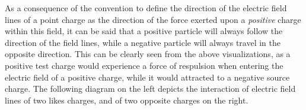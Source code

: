 As a consequence of the convention to define the direction of the electric field lines of a point charge as the direction of the force exerted upon a \emph{positive} charge within this field, it can be said that a positive particle will always follow the direction of the field lines, while a negative particle will always travel in the opposite direction. This can be clearly seen from the above visualizations, as a positive test charge would experience a force of respulsion when entering the electric field of a positive charge, while it would attracted to a negative source charge. The following diagram on the left depicts the interaction of electric field lines of two likes charges, and of two opposite charges on the right.

\begin{figure}[h!]
	\centering
\end{figure}

